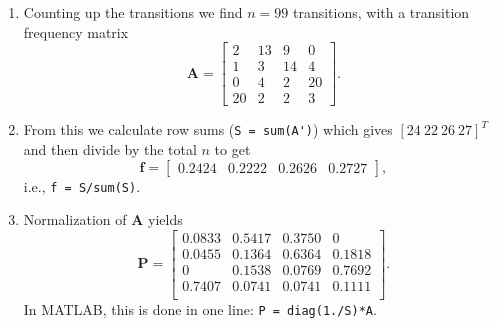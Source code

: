 \begin{enumerate}[label=\alph*)]
\item  Counting up the transitions we find $n = 99$ transitions, with a transition frequency matrix
$$
\mathbf{A} = \left [ \begin{array}{cccc}
2   &    13   &   9   &    0 \\
1   &    3   &    14   &   4 \\
0   &    4   &    2   &    20 \\
20  &    2   &    2   &    3
\end{array} \right ].
$$
\item From this we calculate row sums (\verb!S = sum(A')!) which gives $[ 24 \ 22 \ 26 \ 27 ]^T$ and then
divide by the total $n$ to get
$$
\mathbf{f} = \left [ \begin{array}{cccc}
0.2424 & 0.2222 & 0.2626 & 0.2727
\end{array} \right ],
$$
i.e., \verb!f = S/sum(S)!.

\item Normalization of $\mathbf{A}$ yields
$$
\mathbf{P} = \left [ \begin{array}{cccc}
0.0833  &    0.5417   &   0.3750    &       0 \\
0.0455   &   0.1364    &  0.6364   &   0.1818 \\
0   &   0.1538   &   0.0769   &   0.7692 \\
0.7407   &   0.0741   &   0.0741   &   0.1111 \\
\end{array} \right ].
$$
In MATLAB, this is done in one line: \verb!P = diag(1./S)*A!.


\end{enumerate}
